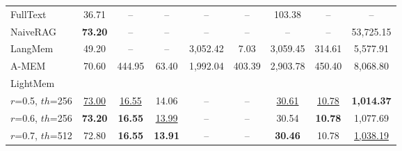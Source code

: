 \begin{table}[t]
{\begin{tabular}{@{}lcccccccc@{}}
\rowcolor{glmblue}\multicolumn{9}{c}{\zhipulogo\ \textbf{GLM-4.6}}\\
\midrule
\rowcolor{glmblue} FullText          & 36.71 & --      & --      & --      & --      & 103.38 & --     & -- \\
\rowcolor{glmblue} NaiveRAG          & \textbf{73.20} & --      & --      & --      & --      & --     & --     & 53,725.15 \\
\rowcolor{glmblue} LangMem           & 49.20 & --      & --      & 3,052.42 & 7.03   & 3,059.45 & 314.61 & 5,577.91 \\
\rowcolor{glmblue} A-MEM             & 70.60 & 444.95  & 63.40   & 1,992.04 & 403.39 & 2,903.78 & 450.40 & 8,068.80 \\
\hdashline
\rowcolor{glmblue} LightMem           &       &         &         &         &         &         &        &        \\
\rowcolor{glmblue} 
$r$=0.5, $th$=256 & \underline{73.00} & \underline{16.55} & 14.06 & -- & -- & \underline{30.61} & \underline{10.78} & \textbf{1,014.37} \\
\rowcolor{glmblue} 
$r$=0.6, $th$=256 & \textbf{73.20} & \textbf{16.55} & \underline{13.99} & -- & -- & 30.54 & \textbf{10.78} & 1,077.69 \\
\rowcolor{glmblue} 
$r$=0.7, $th$=512 & 72.80 & \textbf{16.55} & \textbf{13.91} & -- & -- & \textbf{30.46} & 10.78 & \underline{1,038.19} \\

\bottomrule
\end{tabular}}
\label{tab:memory_comparison}
\end{table}

